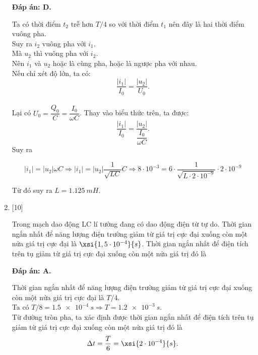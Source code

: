 \begin{enumerate}[label=\bfseries Câu \arabic*:]
	\loigiai
	{		\textbf{Đáp án: D.}
		
Ta có thời điểm $t_2$ trễ hơn $T/4$ so với thời điểm $t_1$ nên đây là hai thời điểm vuông pha. \\
Suy ra $i_2$ vuông pha với $i_1$. \\
Mà $u_2$ thì vuông pha với $i_2$. \\
Nên $i_1$ và $u_2$ hoặc là cùng pha, hoặc là ngược pha với nhau. \\
Nếu chỉ xét độ lớn, ta có:
	$$
	\dfrac{|i_1|}{I_0} = \dfrac{|u_2|}{U_0}.
	$$ \\
Lại có $U_0 = \dfrac{Q_0}{C} = \dfrac{I_0}{\omega C}$. Thay vào biểu thức trên, ta được:
	$$
	\dfrac{|i_1|}{I_0} = \dfrac{|u_2|}{\dfrac{I_0}{\omega C}}.
	$$
Suy ra 

$$|i_1| = |u_2|\omega C \Rightarrow |i_1| = |u_2|\dfrac{1}{\sqrt{LC}} C \Rightarrow 8\cdot10^{-3} = 6 \cdot \dfrac{1}{\sqrt{L \cdot 2\cdot10^{-9}}} \cdot 2\cdot10^{-9}$$

Từ đó suy ra $L = \SI{1,125}{mH}.$
		
	}
	

\item {} [10]
	
	\cauhoi
	{Trong mạch dao động LC lí tưởng đang có dao động điện từ tự do. Thời gian ngắn nhất để năng lượng điện trường giảm từ giá trị cực đại xuống còn một nửa giá trị cực đại là $\xsi{1,5\cdot10^{-4}}{s}$. Thời gian ngắn nhất để điện tích trên tụ giảm từ giá trị cực đại xuống còn một nửa giá trị đó là
	}
	
	\loigiai
	{		\textbf{Đáp án: A.}
		
	Thời gian ngắn nhất để năng lượng điện trường giảm từ giá trị cực đại xuống còn một nửa giá trị cực đại là $T/4$. \\
Ta có $T/8 = \SI{1,5 e-4}{s} \Rightarrow T = \SI{1,2 e-3}{s}.$ \\ 
Từ đường tròn pha, ta xác định được thời gian ngắn nhất để điện tích trên tụ giảm từ giá trị cực đại xuống còn một nửa giá trị đó là
    $$
    \Delta t = \dfrac{T}{6} = \xsi{2\cdot10^{-4}}{s}.
    $$	 
	}


\end{enumerate}

